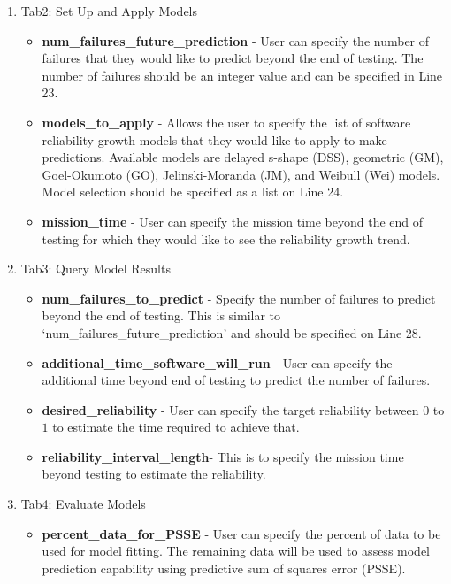 \documentclass[conference]{IEEEtran}
\begin{document}
\begin{itemize}
{\begin{enumerate}
{    \begin{itemize}
    \item{\textbf{confidence\_lvl} - Allows the user to specify a confidence level between $0$ and $1$ to quantify  a desired level of significance that the data exhibits reliability growth using Laplace trend test. The variable is of type `float' and can be specified on Line 20.}
    \end{itemize}
    }
    \item {Tab2: Set Up and Apply Models
    \begin{itemize}
      \item {\textbf{num\_failures\_future\_prediction} - User can specify the number of failures that they would like to predict beyond the end of testing. The number of failures should be an integer value and can be specified in Line 23.}
      \item {\textbf{models\_to\_apply} - Allows the user to specify the list of software reliability growth models that they would like to apply to make predictions. Available models are delayed s-shape (DSS), geometric (GM), Goel-Okumoto (GO), Jelinski-Moranda (JM), and Weibull (Wei) models. Model selection should be specified as a list on Line 24. }
      \item {\textbf{mission\_time} - User can specify the mission time beyond the end of testing for which they would like to see the reliability growth trend.}
    \end{itemize}
    }
    \item {Tab3: Query Model Results
    \begin{itemize}
      \item {\textbf{num\_failures\_to\_predict} - Specify the number of failures to predict beyond the end of testing. This is similar to `num\_failures\_future\_prediction' and should be specified on Line 28.}
      \item {\textbf{additional\_time\_software\_will\_run} - User can specify the additional time beyond end of testing to predict the number of failures. }
      \item {\textbf{desired\_reliability} - User can specify the target reliability between $0$ to $1$ to estimate the time required to achieve that.}
      \item {\textbf{reliability\_interval\_length}- This is to specify the mission time beyond testing to estimate the reliability.}
    \end{itemize}
    }
    \item {Tab4: Evaluate Models
    \begin{itemize}
    \item{\textbf{percent\_data\_for\_PSSE} - User can specify the percent of data to be used for model fitting. The remaining data will be used to assess model prediction capability using predictive sum of squares error (PSSE).}
    \end{itemize}
    }
  \end{enumerate}
  }


\end{itemize}
\end{document}
